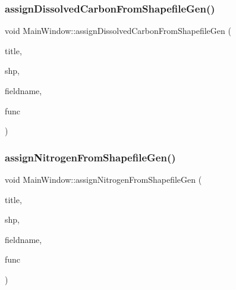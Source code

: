 \subsubsection{\texorpdfstring{assignDissolvedCarbonFromShapefileGen()}{assignDissolvedCarbonFromShapefileGen()}}
{\footnotesize\ttfamily void Main\+Window\+::assign\+Dissolved\+Carbon\+From\+Shapefile\+Gen (\begin{DoxyParamCaption}\item[{Q\+String}]{title,  }\item[{Q\+String}]{shp,  }\item[{const char $\ast$const}]{fieldname,  }\item[{std\+::function$<$ void(O\+G\+R\+Geometry $\ast$, int)$>$}]{func }\end{DoxyParamCaption})\hspace{0.3cm}{\ttfamily [protected]}}

\mbox{\label{class_main_window_aa307fe243fed4f412d7f72c4e04d0d8e}} 
\subsubsection{\texorpdfstring{assignNitrogenFromShapefileGen()}{assignNitrogenFromShapefileGen()}}
{\footnotesize\ttfamily void Main\+Window\+::assign\+Nitrogen\+From\+Shapefile\+Gen (\begin{DoxyParamCaption}\item[{Q\+String}]{title,  }\item[{Q\+String}]{shp,  }\item[{const char $\ast$const}]{fieldname,  }\item[{std\+::function$<$ void(O\+G\+R\+Geometry $\ast$, int)$>$}]{func }\end{DoxyParamCaption})\hspace{0.3cm}{\ttfamily [protected]}}

\mbox{\label{class_main_window_ae74c7af5315d3d121cbd66e1c9c238c0}} 

